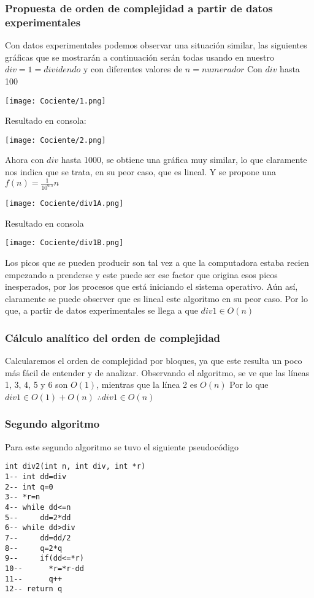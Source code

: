 \documentclass[12pt,twoside]{article}
\begin{document}
\subsubsection{Propuesta de orden de complejidad a partir de datos experimentales}
Con datos experimentales podemos observar una situación similar, las siguientes gráficas que se mostrarán a continuación serán todas usando en nuestro $div = 1 = dividendo$ y con diferentes valores de $n = numerador$\newline\newline
Con $div$ hasta 100
\begin{center}
    \texttt{[image: Cociente/1.png]}
\end{center}
Resultado en consola:
\begin{center}
    \texttt{[image: Cociente/2.png]}
\end{center}
Ahora con $div$ hasta 1000, se obtiene una gráfica muy similar, lo que claramente nos indica que se trata, en su peor caso, que es lineal. Y se propone una $f(n) = \frac{1}{10^6.5}n$
\begin{center}
    \texttt{[image: Cociente/div1A.png]}
\end{center}
Resultado en consola
\begin{center}
    \texttt{[image: Cociente/div1B.png]}
\end{center}
Los picos que se pueden producir son tal vez a que la computadora estaba recien empezando a prenderse y este puede ser ese factor que origina esos picos inesperados, por los procesos que está iniciando el sistema operativo. Aún así, claramente se puede observer que es lineal este algoritmo en su peor caso. Por lo que, a partir de datos experimentales se llega a que $div1 \in O(n)$
\subsubsection{Cálculo analítico del orden de complejidad}
Calcularemos el orden de complejidad por bloques, ya que este resulta un poco más fácil de entender y de analizar.\newline
Observando el algoritmo, se ve que las líneas 1, 3, 4, 5 y 6 son $O(1)$, mientras que la línea 2 es $O(n)$\newline
Por lo que\newline\newline
$div1 \in O(1) + O(n)$\newline
$\therefore div1 \in O(n)$
\subsubsection{Segundo algoritmo}
Para este segundo algoritmo se tuvo el siguiente pseudocódigo
\begin{lstlisting}
int div2(int n, int div, int *r)
1-- int dd=div
2-- int q=0
3-- *r=n
4-- while dd<=n
5--     dd=2*dd
6-- while dd>div
7--     dd=dd/2
8--     q=2*q
9--     if(dd<=*r)
10--      *r=*r-dd
11--      q++
12-- return q
\end{lstlisting}
\end{document}
